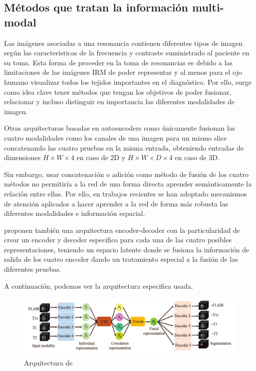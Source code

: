 			
		\subsection{Métodos que tratan la información multi-modal}
		
		Las imágenes asociadas a una resonancia contienen diferentes tipos de imagen según las características de la frecuencia y contraste suministrado al paciente en su toma. Esta forma de proceder en la toma de resonancias es debido a las limitaciones de las imágenes IRM de poder representar y al menos para el ojo humano visualizar todos los tejidos importantes en el diagnóstico. Por ello, surge como idea clave tener métodos que tengan los objetivos de poder fusionar, relacionar y incluso distinguir en importancia las diferentes modalidades de imagen.
		
		Otras arquitecturas basadas en autoencoders como \cite{myronenko20193d} únicamente fusionan las cuatro modalidades como los canales de una imagen para un mismo slice concatenando las cuatro pruebas en la misma entrada, obteniendo entradas de dimensiones $ H \times W \times 4 $ en caso de 2D y $ H \times W \times D \times 4$ en caso de 3D.
		
		Sin embargo, usar concatenación o adición como método de fusión de los cuatro métodos no permitiría a la red de una forma directa aprender semánticamente la relación entre ellas. Por ello, en trabajos recientes se han adoptado mecanismos de atención aplicados a hacer aprender a la red de forma más robusta las diferentes modalidades e información espacial.
		
		\cite{zhou2021latent} proponen también una arquitectura encoder-decoder con la particularidad de crear un encoder y decoder especifico para cada una de las cuatro posibles representaciones, teniendo un espacio latente donde se fusiona la información de salida de los cuatro encoder dando un tratamiento especial a la fusión de las diferentes pruebas.
		
		A continuación, podemos ver la arquitectura especifica usada.
		
		\begin{figure}[H]
			\centering
			\includegraphics[width=0.75\linewidth]{imagenes/latentcorrelationrepresentation.png}
			\caption{Arquitectura de \cite{zhou2021latent}}
		\end{figure}
		

